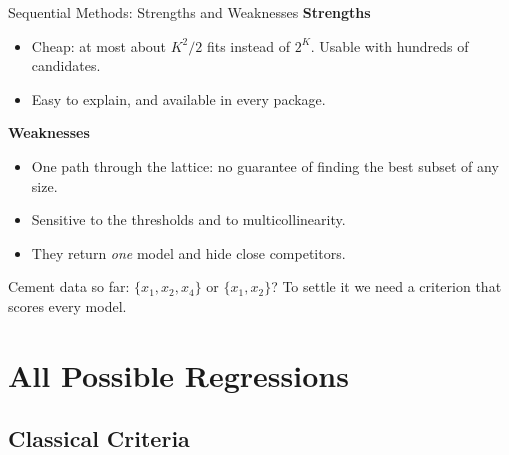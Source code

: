 \begin{frame}{Sequential Methods: Strengths and Weaknesses}
    \textbf{Strengths}
    \begin{itemize}
        \item Cheap: at most about $K^2/2$ fits instead of $2^K$. Usable with hundreds of candidates.
        \item Easy to explain, and available in every package.
    \end{itemize}
    \svspace{0.3em}
    \textbf{Weaknesses}
    \begin{itemize}
        \item One path through the lattice: no guarantee of finding the best subset of any size.
        \item Sensitive to the thresholds and to multicollinearity.
        \item They return \emph{one} model and hide close competitors.
    \end{itemize}
    \svspace{0.3em}
    Cement data so far: $\{x_1,x_2,x_4\}$ or $\{x_1,x_2\}$? To settle it we need a criterion that scores every model.
\end{frame}


\section{All Possible Regressions}


\subsection{Classical Criteria}


